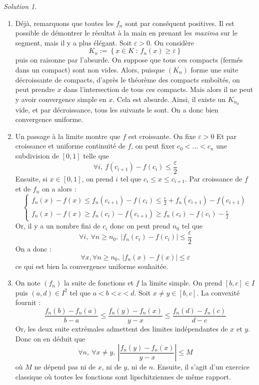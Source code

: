 \documentclass[french]{book}
\theoremstyle{definition}
\theoremstyle{remark}
\newtheorem*{sol}{Solution}
\begin{document}
\begin{sol}
	\begin{enumerate}
		\item Déjà, remarquons que toutes les $f_n$ sont par conséquent positives. Il est possible de démontrer le résultat à la main en prenant les \textit{maxima} sur le segment, mais il y a plus élégant. Soit $\varepsilon>0$. On considère $$K_n:=\left\{x\in K \ : \ f_n(x)\geqslant\varepsilon\right\}$$ puis on raisonne par l'absurde. On suppose que tous ces compacts (fermés dans un compact) sont non vides. Alors, puisque $(K_n)$ forme une suite décroissante de compacts, d'après le théorème des compacts emboîtés, on peut prendre $x$ dans l'intersection de tous ces compacts. Mais alors il ne peut y avoir convergence simple en $x$. Cela est absurde. Ainsi, il existe un $K_{n_0}$ vide, et par décroissance, tous les suivants le sont. On a donc bien convergence uniforme.
		\item Un passage à la limite montre que $f$ est croissante. On fixe $\varepsilon>0$ Et par croissance et uniforme continuité de $f$, on peut fixer $c_0<\ldots<c_n$ une subdivision de $[0,1]$ telle que $$\forall i,\ f(c_{i+1})-f(c_i)\leqslant\frac{\varepsilon}{2}$$ Ensuite, si $x\in[0,1]$, on prend $i$ tel que $c_i\leqslant x\leqslant c_{i+1}$. Par croissance de $f$ et de $f_n$ on a alors : $$\begin{cases}
			f_n(x)-f(x)\leqslant f_n(c_{i+1})-f(c_i)\leqslant\frac{\varepsilon}{2}+f_n(c_{i+1})-f(c_{i+1})\\
			f_n(x)-f(x)\geqslant f_n(c_i)-f(c_{i+1})\geqslant f_n(c_i)-f(c_i)-\frac{\varepsilon}{2}
		\end{cases}$$ Or, il y a un nombre fini de $c_i$ donc on peut prend $n_0$ tel que $$\forall i,\ \forall n\geqslant n_0,\ \lvert f_n(c_i)-f(c_i)\rvert\leqslant\frac{\varepsilon}{2}$$ On a donc : $$\forall x,\forall n\geqslant n_0,\ \lvert f_n(x)-f(x)\rvert\leqslant\varepsilon$$ ce qui est bien la convergence uniforme souhaitée.
		\item On note $(f_n)$ la suite de fonctions et $f$ la limite simple. On prend $[b,c]\in I$ puis $(a,d)\in I^2$ tel que $a<b<c<d$. Soit $x\ne y\in[b,c]$. La convexité fournit : $$\frac{f_n(b)-f_n(a)}{b-a}\leqslant\frac{f_n(y)-f_n(x)}{y-x}\leqslant\frac{f_n(d)-f_n(c)}{d-c}$$ Or, les deux suite extrémales admettent des limites indépendantes de $x$ et $y$. Donc on en déduit que $$\forall n,\ \forall x\ne y,\ \left\lvert \frac{f_n(y)-f_n(x)}{y-x}\right\rvert\leqslant M$$ où $M$ ne dépend pas ni de $x$, ni de $y$, ni de $n$. Ensuite, il s'agit d'un exercice classique où toutes les fonctions sont lipschitziennes de même rapport.
	\end{enumerate}
\end{sol}
\end{document}
